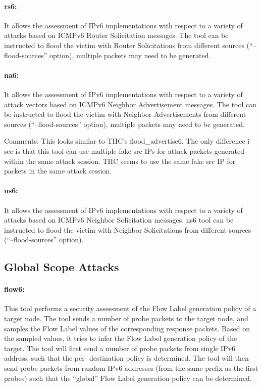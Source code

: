 \documentclass{article}
\begin{document}
\paragraph*{rs6:} It allows the assessment of IPv6 implementations with respect to a variety of attacks based on ICMPv6 Router Solicitation messages. The tool can be instructed to flood the victim with Router Solicitations from different sources (“--flood-sources” option), multiple packets may need to be generated.

\paragraph*{na6:} It allows the assessment of IPv6 implementations with respect to a
variety of attack vectors based on ICMPv6 Neighbor Advertisement messages. The tool can be instructed to flood the victim with Neighbor
Advertisements from different sources (“--flood-sources” option), multiple packets may need to be generated. 

Comments: This looks similar to THC's flood\_advertise6. The only difference i see is that this tool can use multiple fake src IPs for attack packets generated within the same attack session. THC seems to use the same fake src IP for packets in the same attack session.

\paragraph*{ns6:} It allows the assessment of IPv6 implementations with respect to a variety of attacks based on ICMPv6 Neighbor Solicitation messages. ns6 tool can be instructed to flood the victim with Neighbor Solicitations from different sources (“--flood-sources” option).


\subsection{Global Scope Attacks}	 
\paragraph*{flow6:} This tool performs a security assessment of the Flow Label generation policy of a target node. 
The tool sends a number of probe packets to the target node, and samples the Flow Label values of
the corresponding response packets. Based on the sampled values, it tries to infer the Flow Label
generation policy of the target.
The tool will first send a number of probe packets from single IPv6 address, such that the per-
destination policy is determined. The tool will then send probe packets from random IPv6 addresses
(from the same prefix as the first probes) such that the “global” Flow Label generation policy can
be determined.
\end{document}
